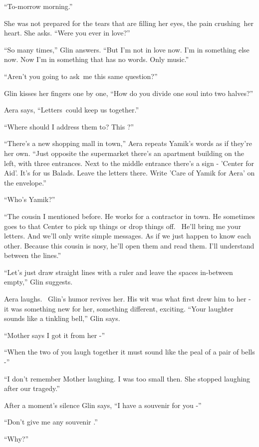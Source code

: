 \documentclass[twoside,11pt]{book}
\begin{document}
``To-morrow morning.''

She was not prepared for the tears that are filling her eyes, the pain crushing~her heart. She asks. ``Were
you ever in love?''

``So many times,'' Glin answers. ``But I'm not in love now. I'm in something else
now. Now I'm in something that has no words. Only music.'' ~

``Aren't you going to ask~me this same question?''

Glin kisses her fingers one by one, ``How do you divide one soul into two halves?''

Aera says, ``Letters~could keep us together.''

``Where should I address them to? This ?''

``There's a new shopping mall in town,'' Aera repeats Yamik's words as if they're her own.
``Just opposite the supermarket there's an apartment building on the left, with three entrances. Next to
the middle entrance there's a sign - {}'Center for Aid'. It's for us Balads. Leave the letters there. Write 'Care of
Yamik for Aera' on the envelope.''

``Who's Yamik?''

``The cousin I mentioned before. He works for a contractor in town. He sometimes goes to that Center to
pick up things or drop things off.~ He'll bring me your letters. And we'll only write simple messages. As if we just
happen to know each other. Because this cousin is nosy, he'll open them and read them. I'll understand between the
lines.''

``Let's just draw straight lines with a ruler and leave the spaces in-between empty,'' Glin
suggests.

Aera laughs. ~Glin's humor revives her. His wit was what first drew him to her - it was something new for her, something
different, exciting. ``Your laughter sounds like a tinkling bell,'' Glin says.

``Mother says I got it from her -''

``When the two of you laugh together it must sound like the peal of a pair of bells -''

``I don't remember Mother laughing. I was too small then. She stopped laughing after our
tragedy.''

After a moment's silence Glin says, ``I have a souvenir for you -''

``Don't give me any souvenir .''

``Why?''
\end{document}
